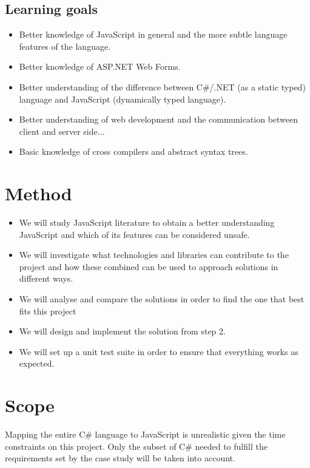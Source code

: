 	\subsection{Learning goals}
		\begin{itemize}

		\item Better knowledge of JavaScript in general and the more subtle language features of the language.
		\item Better knowledge of ASP.NET Web Forms.
	 	\item Better understanding of the difference between C\#/.NET (as a static typed) language and JavaScript (dynamically typed language).
		\item Better understanding of web development and the communication between client and server side...
		\item Basic knowledge of cross compilers and abstract syntax trees.
		\end{itemize}

\section{Method}
	\begin{itemize}
	\item We will study JavaScript literature to obtain a better understanding JavaScript and which of its features can be considered unsafe. 
	\item We will investigate what technologies and libraries can contribute to the project and how these combined can be used to approach solutions in different ways.
	\item We will analyse and compare the solutions in order to find the one that best fits this project
	\item We will design and implement the solution from step 2.
	\item We will set up a unit test suite in order to ensure that everything works as expected.
	\end{itemize}

\section{Scope}
	Mapping the entire C\# language to JavaScript is unrealistic given the time constraints on this project. Only the subset of C\# needed to fulfill the requirements set by the case study will be taken into account.

